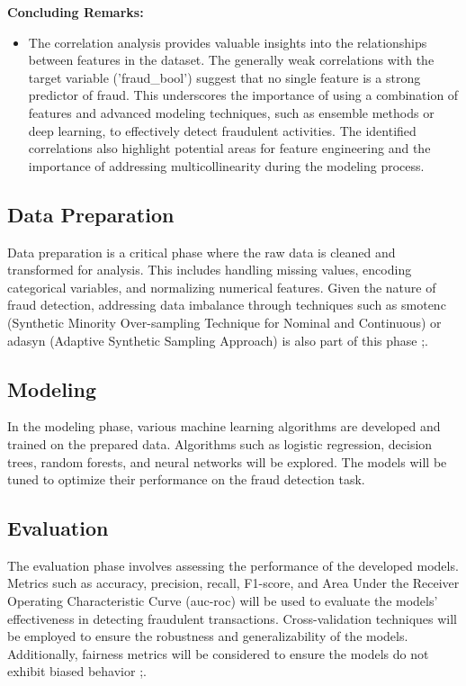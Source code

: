 \documentclass[12pt,a4paper]{report}
\begin{document}
\textbf{Concluding Remarks:}
\begin{itemize}
    \item The correlation analysis provides valuable insights into the relationships between features in the dataset. The generally weak correlations with the target variable ('fraud\_bool') suggest that no single feature is a strong predictor of fraud. This underscores the importance of using a combination of features and advanced modeling techniques, such as ensemble methods or deep learning, to effectively detect fraudulent activities. The identified correlations also highlight potential areas for feature engineering and the importance of addressing multicollinearity during the modeling process.
\end{itemize}

\subsection{Data Preparation}
Data preparation is a critical phase where the raw data is cleaned and transformed for analysis. This includes handling missing values, encoding categorical variables, and normalizing numerical features. Given the nature of fraud detection, addressing data imbalance through techniques such as \acrshort{smotenc} (Synthetic Minority Over-sampling Technique for Nominal and Continuous) or \acrshort{adasyn} (Adaptive Synthetic Sampling Approach) is also part of this phase \citep{chawla2002smote};\citep{he2008adasyn}.\\


\subsection{Modeling}
In the modeling phase, various machine learning algorithms are developed and trained on the prepared data. Algorithms such as logistic regression, decision trees, random forests, and neural networks will be explored. The models will be tuned to optimize their performance on the fraud detection task.

\subsection{Evaluation}
The evaluation phase involves assessing the performance of the developed models. Metrics such as accuracy, precision, recall, F1-score, and Area Under the Receiver Operating Characteristic Curve (\acrshort{auc}-\acrshort{roc}) will be used to evaluate the models' effectiveness in detecting fraudulent transactions. Cross-validation techniques will be employed to ensure the robustness and generalizability of the models. Additionally, fairness metrics will be considered to ensure the models do not exhibit biased behavior \citep{barocas2023fairness};\citep{mehrabi2021survey}.\\
\end{document}
